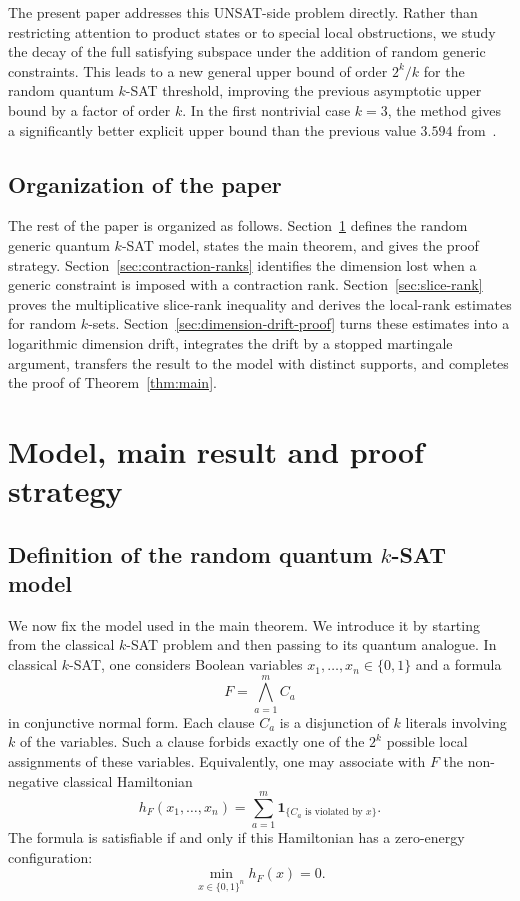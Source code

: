 \documentclass[11pt]{article}
\begin{document}
The present paper addresses this UNSAT-side problem directly.  Rather than
restricting attention to product states or to special local obstructions, we
study the decay of the full satisfying subspace under the addition of random
generic constraints.  This leads to a new general upper bound of order
\(2^k/k\) for the random quantum \(k\)-SAT threshold, improving the previous
asymptotic upper bound by a factor of order \(k\).  In the first nontrivial
case \(k=3\), the method gives a significantly better explicit upper bound
than the previous value \(3.594\) from~\cite{BMR}.



\subsection{Organization of the paper}\label{subsec:organization}

The rest of the paper is organized as follows.  Section~\ref{sec:model-main-strategy}
defines the random generic quantum \(k\)-SAT model, states the main
theorem, and gives the proof strategy.  Section~\ref{sec:contraction-ranks}
identifies the dimension lost when a generic constraint is imposed with a
contraction rank.  Section~\ref{sec:slice-rank} proves the multiplicative
slice-rank inequality and derives the local-rank estimates for random
\(k\)-sets.  Section~\ref{sec:dimension-drift-proof} turns these estimates into
a logarithmic dimension drift, integrates the drift by a stopped martingale
argument, transfers the result to the model
with distinct supports, and completes the proof of Theorem~\ref{thm:main}.

\section{Model, main result and proof strategy}\label{sec:model-main-strategy}

\subsection{Definition of the random quantum \(k\)-SAT model}
\label{subsec:model}

We now fix the model used in the main theorem.  We introduce it by starting
from the classical \(k\)-SAT problem and then passing to its quantum analogue.
In classical \(k\)-SAT, one considers Boolean variables
\(x_1,\ldots,x_n\in\{0,1\}\) and a formula
\[
F = \bigwedge_{a=1}^m C_a
\]
in conjunctive normal form.  Each clause \(C_a\) is a disjunction of \(k\)
literals involving \(k\) of the variables.  Such a clause forbids exactly one
of the \(2^k\) possible local assignments of these variables.  Equivalently,
one may associate with \(F\) the non-negative classical Hamiltonian
\[
h_F(x_1,\ldots,x_n)
=
\sum_{a=1}^m
\mathbf 1_{\{C_a \text{ is violated by } x\}} .
\]
The formula is satisfiable if and only if this Hamiltonian has a zero-energy
configuration:
\[
\min_{x\in\{0,1\}^n} h_F(x)=0 .
\]
\end{document}
